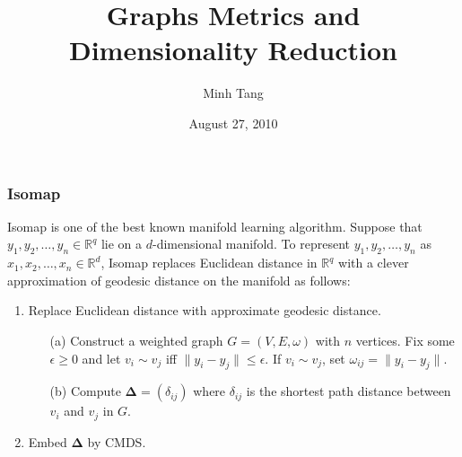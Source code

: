 \documentclass[professionalfonts, hyperref={pdfpagelabels=false,
  colorlinks=true, linkcolor=purple}]{beamer}
\begin{document}
\title[Graphs Metrics and Dimensionality Reduction]{Graphs Metrics and
  Dimensionality Reduction}
\author[Tang]{Minh Tang}

\date{August 27, 2010}

\begin{frame}
\titlepage
\end{frame}

\begin{frame}
  \frametitle{Isomap} 
  Isomap \cite{tenebaum00:_global_geomet_framew_nonlin_dimen_reduc} is
  one of the best known manifold learning algorithm. Suppose that
  $y_1, y_2, \dots, y_n \in \mathbb{R}^{q}$ lie on a $d$-dimensional
  manifold. To represent $y_1, y_2, \dots, y_n$ as $x_1, x_2,
  \dots, x_n \in \mathbb{R}^{d}$, Isomap replaces Euclidean distance
  in $\mathbb{R}^{q}$ with a clever approximation of geodesic distance
  on the manifold as follows: 
  \vskip10pt
  \begin{enumerate}
  \item Replace Euclidean distance with approximate geodesic
    distance.
    \begin{enumerate}
    \item[(a)] Construct a weighted graph $G = (V,E,\omega)$ with $n$
      vertices. Fix some $\epsilon \geq 0$ and let $v_i \sim v_j$ iff
      $\|y_i - y_j\| \leq \epsilon$. If $v_i \sim v_j$, set
      $\omega_{ij} = \|y_i - y_j\|$.
    \item[(b)] Compute $\bm{\Delta} = (\delta_{ij})$ where
      $\delta_{ij}$ is the shortest path distance between $v_i$ and
      $v_j$ in $G$.
    \end{enumerate}
   \item Embed $\bm{\Delta}$ by CMDS.
  \end{enumerate}

\end{frame}
\end{document}
